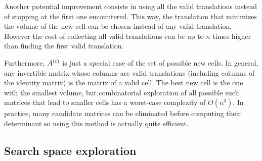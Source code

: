 \documentclass[main.tex]{subfiles}
\begin{document}
Another potential improvement consists in using all the valid translations instead of stopping at the first one encountered. This way, the translation that minimizes the volume of the new cell can be chosen instead of any valid translation. However the cost of collecting all valid translations can be up to $n$ times higher than finding the first valid translation.

Furthermore, $A^{\left(t\right)}$ is just a special case of the set of possible new cells. In general, any invertible matrix whose columns are valid translations (including columns of the identity matrix) is the matrix of a valid cell. The best new cell is the one with the smallest volume, but combinatorial exploration of all possible such matrices that lead to smaller cells has a worst-case complexity of $O(n^3)$. In practice, many candidate matrices can be eliminated before computing their determinant so using this method is actually quite efficient.



% 
%
%


\subsection{Search space exploration}
\end{document}
